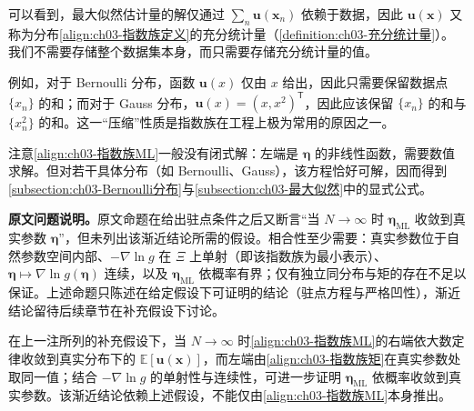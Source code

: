 \documentclass[../../main.tex]{subfiles}
\begin{document}
\begin{remark}
可以看到，最大似然估计量的解仅通过 $\sum_{n}\boldsymbol{u}(\boldsymbol{x}_n)$ 依赖于数据，因此 $\boldsymbol{u}(\boldsymbol{x})$ 又称为分布\eqref{align:ch03-指数族定义}的充分统计量（\cref{definition:ch03-充分统计量}）。我们不需要存储整个数据集本身，而只需要存储充分统计量的值。

例如，对于 Bernoulli 分布，函数 $\boldsymbol{u}(x)$ 仅由 $x$ 给出，因此只需要保留数据点 $\{x_n\}$ 的和；而对于 Gauss 分布，$\boldsymbol{u}(x)=(x,x^{2})^{\mathsf{T}}$，因此应该保留 $\{x_n\}$ 的和与 $\{x_n^{2}\}$ 的和。这一“压缩”性质是指数族在工程上极为常用的原因之一。

注意\eqref{align:ch03-指数族ML}一般没有闭式解：左端是 $\boldsymbol{\eta}$ 的非线性函数，需要数值求解。但对若干具体分布（如 Bernoulli、Gauss），该方程恰好可解，因而得到\cref{subsection:ch03-Bernoulli分布}与\cref{subsection:ch03-最大似然}中的显式公式。

\textbf{原文问题说明。}原文命题在给出驻点条件之后又断言“当 $N\to\infty$ 时 $\boldsymbol{\eta}_{\mathrm{ML}}$ 收敛到真实参数 $\boldsymbol{\eta}$”，但未列出该渐近结论所需的假设。相合性至少需要：真实参数位于自然参数空间内部、$-\nabla\ln g$ 在 $\Xi$ 上单射（即该指数族为最小表示）、$\boldsymbol{\eta}\mapsto\nabla\ln g(\boldsymbol{\eta})$ 连续，以及 $\boldsymbol{\eta}_{\mathrm{ML}}$ 依概率有界；仅有独立同分布与矩的存在不足以保证。上述命题只陈述在给定假设下可证明的结论（驻点方程与严格凹性），渐近结论留待后续章节在补充假设下讨论。
\end{remark}

在上一注所列的补充假设下，当 $N\to\infty$ 时\eqref{align:ch03-指数族ML}的右端依大数定律收敛到真实分布下的 $\mathbb{E}[\boldsymbol{u}(\boldsymbol{x})]$，而左端由\eqref{align:ch03-指数族矩}在真实参数处取同一值；结合 $-\nabla\ln g$ 的单射性与连续性，可进一步证明 $\boldsymbol{\eta}_{\mathrm{ML}}$ 依概率收敛到真实参数。该渐近结论依赖上述假设，不能仅由\eqref{align:ch03-指数族ML}本身推出。
\end{document}
